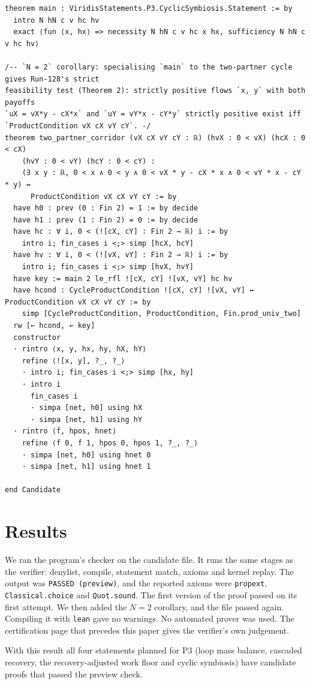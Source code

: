 \documentclass[11pt]{article}
\theoremstyle{definition}
\theoremstyle{remark}
\begin{document}
\begin{lstlisting}[caption={The complete candidate proof \texttt{proofs/P3.CyclicSymbiosis.lean}.}]
theorem main : ViridisStatements.P3.CyclicSymbiosis.Statement := by
  intro N hN c v hc hv
  exact ⟨fun ⟨x, hx⟩ => necessity N hN c v hc x hx, sufficiency N hN c v hc hv⟩

/-- `N = 2` corollary: specialising `main` to the two-partner cycle gives Run-128's strict
feasibility test (Theorem 2): strictly positive flows `x, y` with both payoffs
`uX = vX*y - cX*x` and `uY = vY*x - cY*y` strictly positive exist iff
`ProductCondition vX cX vY cY`. -/
theorem two_partner_corridor (vX cX vY cY : ℝ) (hvX : 0 < vX) (hcX : 0 < cX)
    (hvY : 0 < vY) (hcY : 0 < cY) :
    (∃ x y : ℝ, 0 < x ∧ 0 < y ∧ 0 < vX * y - cX * x ∧ 0 < vY * x - cY * y) ↔
      ProductCondition vX cX vY cY := by
  have h0 : prev (0 : Fin 2) = 1 := by decide
  have h1 : prev (1 : Fin 2) = 0 := by decide
  have hc : ∀ i, 0 < (![cX, cY] : Fin 2 → ℝ) i := by
    intro i; fin_cases i <;> simp [hcX, hcY]
  have hv : ∀ i, 0 < (![vX, vY] : Fin 2 → ℝ) i := by
    intro i; fin_cases i <;> simp [hvX, hvY]
  have key := main 2 le_rfl ![cX, cY] ![vX, vY] hc hv
  have hcond : CycleProductCondition ![cX, cY] ![vX, vY] ↔ ProductCondition vX cX vY cY := by
    simp [CycleProductCondition, ProductCondition, Fin.prod_univ_two]
  rw [← hcond, ← key]
  constructor
  · rintro ⟨x, y, hx, hy, hX, hY⟩
    refine ⟨![x, y], ?_, ?_⟩
    · intro i; fin_cases i <;> simp [hx, hy]
    · intro i
      fin_cases i
      · simpa [net, h0] using hX
      · simpa [net, h1] using hY
  · rintro ⟨f, hpos, hnet⟩
    refine ⟨f 0, f 1, hpos 0, hpos 1, ?_, ?_⟩
    · simpa [net, h0] using hnet 0
    · simpa [net, h1] using hnet 1

end Candidate
\end{lstlisting}

\section{Results}
\label{sec:results}
We ran the program's checker on the candidate file. It runs the same stages as the verifier:
denylist, compile, statement match, axioms and kernel replay. The output was
\texttt{PASSED (preview)}, and the reported axioms were \texttt{propext},
\texttt{Classical.choice} and \texttt{Quot.sound}. The first version of the proof passed on its
first attempt. We then added the $N=2$ corollary, and the file passed again. Compiling it with
\texttt{lean} gave no warnings. No automated prover was used. The certification page that precedes
this paper gives the verifier's own judgement.

With this result all four statements planned for P3 (loop mass balance, cascaded recovery, the
recovery-adjusted work floor and cyclic symbiosis) have candidate proofs that passed the preview
check.
\end{document}
